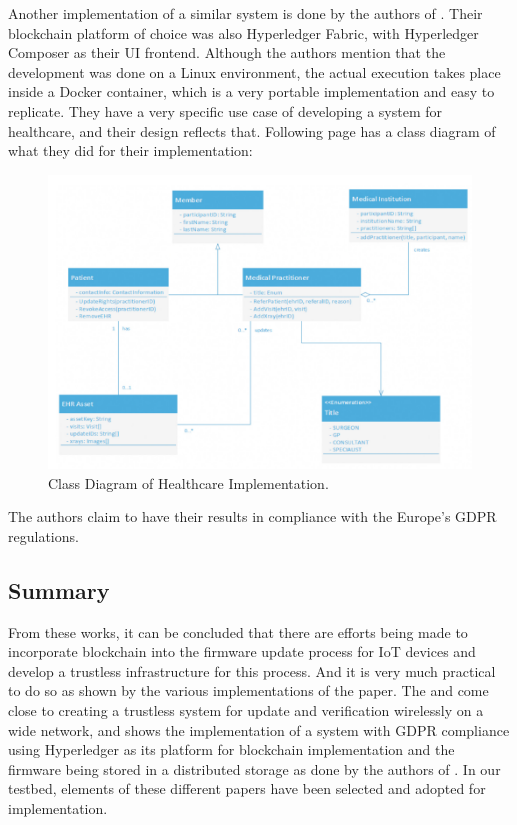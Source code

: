 \documentclass{article}
\begin{document}
Another implementation of a similar system is done by the authors of \cite{healthcare}. Their blockchain platform of choice was also Hyperledger Fabric, with Hyperledger Composer as their UI frontend. Although the authors mention that the development was done on a Linux environment, the actual execution takes place inside a Docker container, which is a very portable implementation and easy to replicate. They have a very specific use case of developing a system for healthcare, and their design reflects that. Following page has a class diagram of what they did for their implementation:
\begin{figure}[H]
    \centering
    \includegraphics[width=\textwidth]{healthcare01.png}
    \caption{Class Diagram of Healthcare Implementation.\cite{healthcare}}
\end{figure}


The authors claim to have their results in compliance with the Europe's GDPR regulations.

\subsection{Summary}
From these works, it can be concluded that there are efforts being made to incorporate blockchain into the firmware update process for IoT devices and develop a trustless infrastructure for this process. And it is very much practical to do so as shown by the various implementations of the paper. The \cite{otaupdate} and \cite{lora} come close to creating a trustless system for update and verification wirelessly on a wide network, and \cite{healthcare} shows the implementation of a system with GDPR compliance using Hyperledger as its platform for blockchain implementation and the firmware being stored in a distributed storage as done by the authors of \cite{blockchainupdate}. In our testbed, elements of these different papers have been selected and adopted for implementation.
\end{document}
